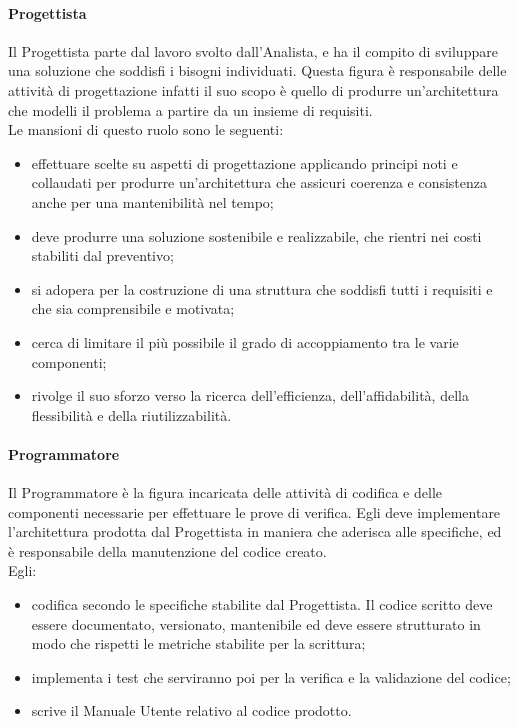 			\paragraph{Progettista }
				Il Progettista parte dal lavoro svolto dall’Analista, e ha il compito di sviluppare una soluzione che soddisfi i bisogni individuati. Questa figura è responsabile delle attività di progettazione infatti il suo scopo è quello di produrre un’architettura che modelli il problema a partire da un insieme di requisiti. \\
				Le mansioni di questo ruolo sono le seguenti:\\
				\begin{itemize}
					\item effettuare scelte su aspetti di progettazione applicando principi noti e collaudati per produrre un’architettura che assicuri coerenza e consistenza anche per una mantenibilità nel tempo;
					\item deve produrre una soluzione sostenibile e realizzabile, che rientri nei costi stabiliti dal preventivo;
					\item si adopera per la costruzione di una struttura che soddisfi tutti i requisiti e che sia comprensibile e motivata;
					\item cerca di limitare il più possibile il grado di accoppiamento tra le varie componenti;
					\item rivolge il suo sforzo verso la ricerca dell’efficienza, dell’affidabilità, della flessibilità e della riutilizzabilità.
				\end{itemize}
			\paragraph{Programmatore }
				Il Programmatore è la figura incaricata delle attività di codifica e delle componenti necessarie per effettuare le prove di verifica. Egli deve implementare l’architettura prodotta dal Progettista in maniera che aderisca alle specifiche, ed è responsabile della manutenzione del codice creato. \\
				Egli:
				\begin{itemize}
					\item codifica secondo le specifiche stabilite dal Progettista. Il codice scritto deve essere documentato, versionato, mantenibile ed deve essere strutturato in modo che rispetti le metriche stabilite per la scrittura;
					\item implementa i test che serviranno poi per la verifica e la validazione del codice;
					\item scrive il Manuale Utente relativo al codice prodotto.
				\end{itemize}
